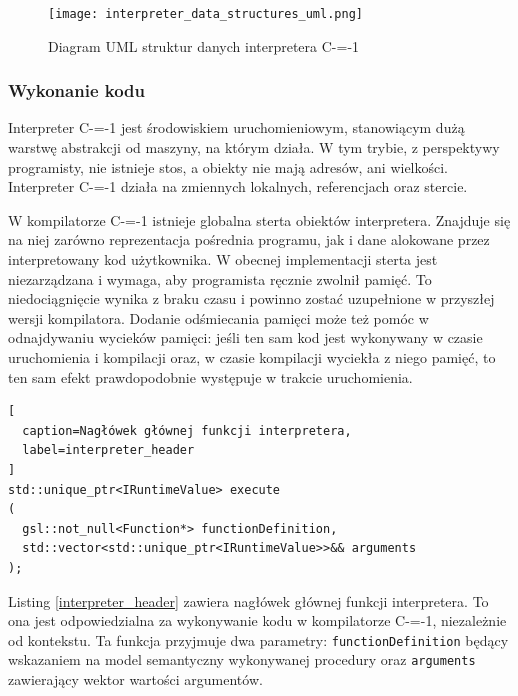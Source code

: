 \begin{figure}
  \caption{Diagram UML struktur danych interpretera C-=-1}
  \label{implementation:data_structures:uml_diagram}
  \texttt{[image: interpreter\_data\_structures\_uml.png]}
\end{figure}

\subsubsection{Wykonanie kodu}
\label{implementation:interpreter:code_execution}

Interpreter C-=-1 jest środowiskiem uruchomieniowym, stanowiącym dużą warstwę abstrakcji od maszyny, na którym działa.
W tym trybie, z perspektywy programisty, nie istnieje stos, a obiekty nie mają adresów, ani wielkości.
Interpreter C-=-1 działa na zmiennych lokalnych, referencjach oraz stercie.

W kompilatorze C-=-1 istnieje globalna sterta obiektów interpretera.
Znajduje się na niej zarówno reprezentacja pośrednia programu, jak i dane alokowane przez interpretowany kod użytkownika.
W obecnej implementacji sterta jest niezarządzana i wymaga, aby programista ręcznie zwolnił pamięć.
To niedociągnięcie wynika z braku czasu i powinno zostać uzupełnione w przyszłej wersji kompilatora.
Dodanie odśmiecania pamięci może też pomóc w odnajdywaniu wycieków pamięci: jeśli ten sam kod jest wykonywany w czasie uruchomienia i kompilacji oraz, w czasie kompilacji wyciekła z niego pamięć, to ten sam efekt prawdopodobnie występuje w trakcie uruchomienia.

\begin{lstlisting}[
  caption=Nagłówek głównej funkcji interpretera,
  label=interpreter_header
]
std::unique_ptr<IRuntimeValue> execute
(
  gsl::not_null<Function*> functionDefinition,
  std::vector<std::unique_ptr<IRuntimeValue>>&& arguments
);
\end{lstlisting}

Listing \ref{interpreter_header} zawiera nagłówek głównej funkcji interpretera.
To ona jest odpowiedzialna za wykonywanie kodu w kompilatorze C-=-1, niezależnie od kontekstu.
Ta funkcja przyjmuje dwa parametry: \lstinline{functionDefinition} będący wskazaniem na model semantyczny wykonywanej procedury oraz \lstinline{arguments} zawierający wektor wartości argumentów.

